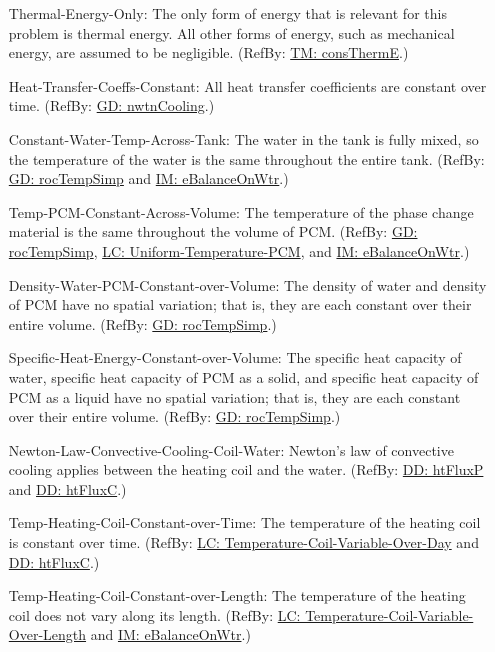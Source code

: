 \documentclass[12pt]{article}
\begin{document}
\begin{itemize}
\item[Thermal-Energy-Only:\phantomsection\label{assumpTEO}]{The only form of energy that is relevant for this problem is thermal energy. All other forms of energy, such as mechanical energy, are assumed to be negligible. (RefBy: \hyperref[TM:consThermE]{TM: consThermE}.)}
\item[Heat-Transfer-Coeffs-Constant:\phantomsection\label{assumpHTCC}]{All heat transfer coefficients are constant over time. (RefBy: \hyperref[GD:nwtnCooling]{GD: nwtnCooling}.)}
\item[Constant-Water-Temp-Across-Tank:\phantomsection\label{assumpCWTAT}]{The water in the tank is fully mixed, so the temperature of the water is the same throughout the entire tank. (RefBy: \hyperref[GD:rocTempSimp]{GD: rocTempSimp} and \hyperref[IM:eBalanceOnWtr]{IM: eBalanceOnWtr}.)}
\item[Temp-PCM-Constant-Across-Volume:\phantomsection\label{assumpTPCAV}]{The temperature of the phase change material is the same throughout the volume of PCM. (RefBy: \hyperref[GD:rocTempSimp]{GD: rocTempSimp}, \hyperref[likeChgUTP]{LC: Uniform-Temperature-PCM}, and \hyperref[IM:eBalanceOnWtr]{IM: eBalanceOnWtr}.)}
\item[Density-Water-PCM-Constant-over-Volume:\phantomsection\label{assumpDWPCoV}]{The density of water and density of PCM have no spatial variation; that is, they are each constant over their entire volume. (RefBy: \hyperref[GD:rocTempSimp]{GD: rocTempSimp}.)}
\item[Specific-Heat-Energy-Constant-over-Volume:\phantomsection\label{assumpSHECov}]{The specific heat capacity of water, specific heat capacity of PCM as a solid, and specific heat capacity of PCM as a liquid have no spatial variation; that is, they are each constant over their entire volume. (RefBy: \hyperref[GD:rocTempSimp]{GD: rocTempSimp}.)}
\item[Newton-Law-Convective-Cooling-Coil-Water:\phantomsection\label{assumpLCCCW}]{Newton's law of convective cooling applies between the heating coil and the water. (RefBy: \hyperref[DD:htFluxP]{DD: htFluxP} and \hyperref[DD:htFluxC]{DD: htFluxC}.)}
\item[Temp-Heating-Coil-Constant-over-Time:\phantomsection\label{assumpTHCCoT}]{The temperature of the heating coil is constant over time. (RefBy: \hyperref[likeChgTCVOD]{LC: Temperature-Coil-Variable-Over-Day} and \hyperref[DD:htFluxC]{DD: htFluxC}.)}
\item[Temp-Heating-Coil-Constant-over-Length:\phantomsection\label{assumpTHCCoL}]{The temperature of the heating coil does not vary along its length. (RefBy: \hyperref[likeChgTCVOL]{LC: Temperature-Coil-Variable-Over-Length} and \hyperref[IM:eBalanceOnWtr]{IM: eBalanceOnWtr}.)}

\end{itemize}
\end{document}
